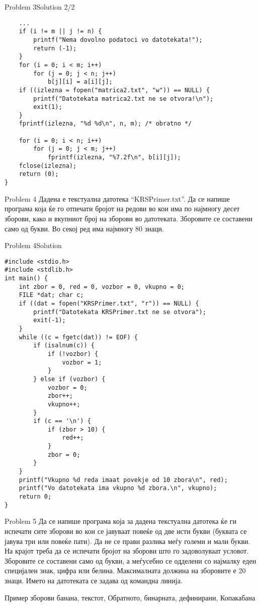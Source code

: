 \begin{frame}[fragile]{Problem 3}{Solution 2/2} 
\begin{lstlisting}
    ...
    if (i != m || j != n) {
        printf("Nema dovolno podatoci vo datotekata!");
        return (-1);
    }
    for (i = 0; i < m; i++)
        for (j = 0; j < n; j++)
            b[j][i] = a[i][j];
    if ((izlezna = fopen("matrica2.txt", "w")) == NULL) {
        printf("Datotekata matrica2.txt ne se otvora!\n");
        exit(1);
    }
    fprintf(izlezna, "%d %d\n", n, m); /* obratno */

    for (i = 0; i < n; i++)
        for (j = 0; j < m; j++)
            fprintf(izlezna, "%7.2f\n", b[i][j]);
    fclose(izlezna);
    return (0);
}
\end{lstlisting}
\end{frame}


\begin{frame}{Problem 4}
Дадена е текстуална датотека ``KRSPrimer.txt''. Да се напише програма која ќе го
отпечати бројот на редови во кои има по најмногу десет зборови, како и вкупниот
број на зборови во датотеката. Зборовите се составени само од букви. Во секој
ред има најмногу 80 знаци.
\end{frame}

\begin{frame}[fragile]{Problem 4}{Solution}
\begin{lstlisting}
#include <stdio.h>
#include <stdlib.h>
int main() {
    int zbor = 0, red = 0, vozbor = 0, vkupno = 0;
    FILE *dat; char c; 
    if ((dat = fopen("KRSPrimer.txt", "r")) == NULL) {
        printf("Datotekata KRSPrimer.txt ne se otvora");
        exit(-1);
    }
    while ((c = fgetc(dat)) != EOF) {
        if (isalnum(c)) {
            if (!vozbor) {
                vozbor = 1;
            }
        } else if (vozbor) {
            vozbor = 0;
            zbor++;
            vkupno++;
        }
        if (c == '\n') {
            if (zbor > 10) {
                red++;
            }
            zbor = 0;
        }
    }
    printf("Vkupno %d reda imaat povekje od 10 zbora\n", red);
    printf("Vo datotekata ima vkupno %d zbora.\n", vkupno);
    return 0;
}
\end{lstlisting}
\end{frame}

\begin{frame}{Problem 5}
Да се напише програма која за дадена текстуална датотека ќе ги испечати
сите зборови во кои се јавуваат повеќе од две исти букви (буквата се јавува три или
повеќе пати). Да не се прави разлика меѓу големи и мали букви. На крајот треба
да се испечати бројот на зборови што го задоволуваат условот. Зборовите се
составени само од букви, а меѓусебно се одделени со најмалку еден специјален
знак, цифра или белина. Максималната должина на зборовите е 20 знаци. Името на
датотеката се задава од командна линија. 
\begin{exampleblock}{Пример зборови}
банана, текстот, Обратното, бинарната, дефинирани, Копакабана
\end{exampleblock}
\end{frame}

